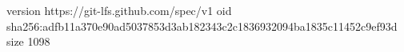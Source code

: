 version https://git-lfs.github.com/spec/v1
oid sha256:adfb11a370e90ad5037853d3ab182343c2c1836932094ba1835c11452c9ef93d
size 1098
